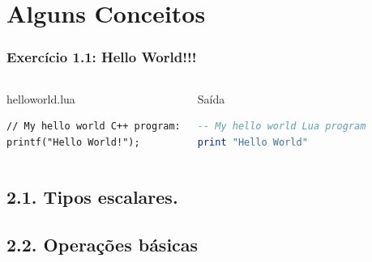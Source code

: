 \documentclass[brazil]{beamer}
\begin{document}
\section{Alguns Conceitos}
\begin{frame}[fragile]
  \frametitle{Exercício 1.1: Hello World!!!}
  \pause
  \begin{columns}
      \begin{block}{helloworld.lua}
        \begin{lstlisting}
// My hello world C++ program:
printf("Hello World!");
        \end{lstlisting}
      \end{block}
    \pause
      \begin{block}{Saída}
        \begin{lstlisting}[language=lua]
-- My hello world Lua program
print "Hello World"
        \end{lstlisting}
      \end{block}
  \end{columns}
\end{frame}
\subsection{2.1. Tipos escalares.}
\subsection{2.2. Operações básicas}
\end{document}
